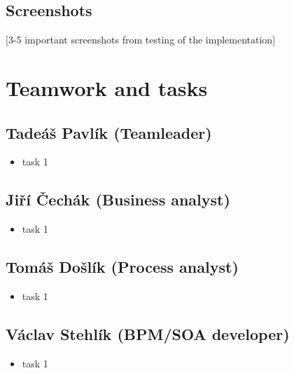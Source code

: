 \documentclass[11pt,a4paper]{article}
\begin{document}

\subsection{Screenshots}

[3-5 important screenshots from testing of the implementation]


\section{Teamwork and tasks}

\subsection{Tadeáš Pavlík (Teamleader)}

\begin{itemize}
    \item task 1
\end{itemize}

\subsection{Jiří Čechák (Business analyst)}

\begin{itemize}
    \item task 1
\end{itemize}

\subsection{Tomáš Došlík (Process analyst)}

\begin{itemize}
    \item task 1
\end{itemize}

\subsection{Václav Stehlík (BPM/SOA developer)}

\begin{itemize}
    \item task 1
\end{itemize}
\end{document}
